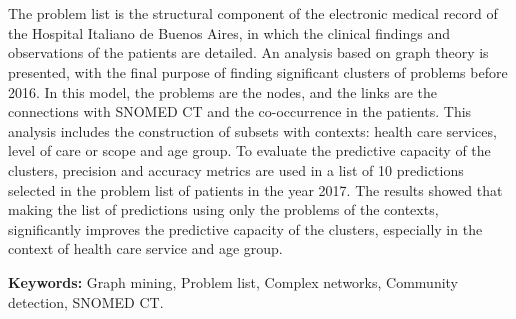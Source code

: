 \chapter*{\runtitle}

\noindent The problem list is the structural component of the electronic medical record of the Hospital Italiano de Buenos Aires, in which the clinical findings and observations of the patients are detailed. An analysis based on graph theory is presented, with the final purpose of finding significant clusters of problems before 2016. In this model, the problems are the nodes, and the links are the connections with SNOMED CT and the co-occurrence in the patients. This analysis includes the construction of subsets with contexts: health care services, level of care or scope and age group. To evaluate the predictive capacity of the clusters, precision and accuracy metrics are used in a list of 10 predictions selected in the problem list of patients in the year 2017. The results showed that making the list of predictions using only the problems of the contexts, significantly improves the predictive capacity of the clusters, especially in the context of health care service and age group.

\bigskip

\noindent\textbf{Keywords:} Graph mining, Problem list, Complex networks, Community detection, SNOMED CT.